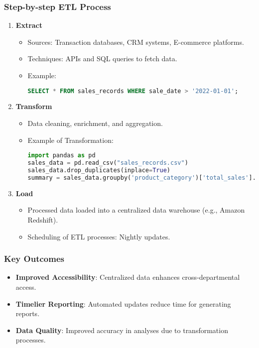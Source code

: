 \documentclass[aspectratio=169]{beamer}
\begin{document}
\begin{frame}[fragile]
    \frametitle{Step-by-step ETL Process}
    \begin{enumerate}
        \item \textbf{Extract}
        \begin{itemize}
            \item Sources: Transaction databases, CRM systems, E-commerce platforms.
            \item Techniques: APIs and SQL queries to fetch data.
            \item Example:
            \begin{lstlisting}[language=SQL]
SELECT * FROM sales_records WHERE sale_date > '2022-01-01';
            \end{lstlisting}
        \end{itemize}

        \pause
        
        \item \textbf{Transform}
        \begin{itemize}
            \item Data cleaning, enrichment, and aggregation.
            \item Example of Transformation:
            \begin{lstlisting}[language=Python]
import pandas as pd
sales_data = pd.read_csv("sales_records.csv")
sales_data.drop_duplicates(inplace=True)
summary = sales_data.groupby('product_category')['total_sales'].sum()
            \end{lstlisting}
        \end{itemize}

        \pause
        
        \item \textbf{Load}
        \begin{itemize}
            \item Processed data loaded into a centralized data warehouse (e.g., Amazon Redshift).
            \item Scheduling of ETL processes: Nightly updates.
        \end{itemize}
    \end{enumerate}
\end{frame}

\begin{frame}[fragile]
    \frametitle{Key Outcomes}
    \begin{itemize}
        \item \textbf{Improved Accessibility}: Centralized data enhances cross-departmental access.
        \item \textbf{Timelier Reporting}: Automated updates reduce time for generating reports.
        \item \textbf{Data Quality}: Improved accuracy in analyses due to transformation processes.
    \end{itemize}
\end{frame}
\end{document}
